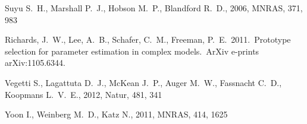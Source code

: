 \documentclass[letterpaper, 11pt]{article}
\begin{document}
\begin{thebibliography}{99}
Suyu S.~H., Marshall P.~J., Hobson M.~P., Blandford R.~D., 2006, MNRAS, 
371, 983 

 Richards, J.~W., Lee, 
A.~B., Schafer, C.~M., Freeman, P.~E.\ 2011.\ Prototype selection for 
parameter estimation in complex models.\ ArXiv e-prints arXiv:1105.6344. 

 Vegetti S., Lagattuta D.~J., McKean J.~P., 
Auger M.~W., Fassnacht C.~D., Koopmans L.~V.~E., 2012, Natur, 481, 341 

 Yoon I., Weinberg M.~D., Katz N., 2011, MNRAS, 414, 1625 
\end{thebibliography}
\end{document}
